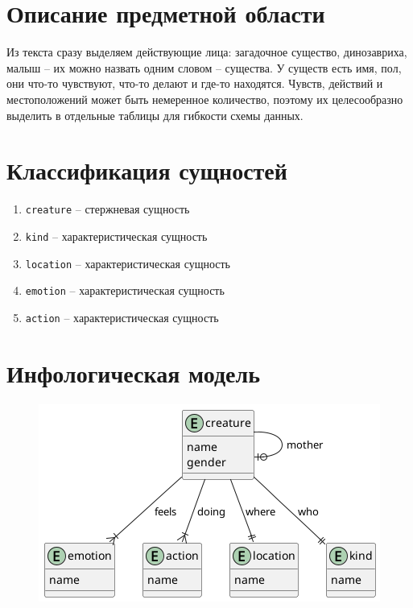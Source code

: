 \documentclass{article}
\begin{document}
\section{Описание предметной области}

Из текста сразу выделяем действующие лица:
загадочное существо, динозавриха,
малыш -- их можно назвать одним словом --
существа. У существ есть имя, пол, они что-то
чувствуют, что-то делают и где-то находятся.
Чувств, действий и местоположений может быть
немеренное количество, поэтому их целесообразно
выделить в отдельные таблицы для гибкости схемы
данных.

\section{Классификация сущностей}

\begin{enumerate}
    \item \texttt{creature} -- стержневая сущность
    \item \texttt{kind} -- характеристическая сущность
    \item \texttt{location} -- характеристическая сущность
    \item \texttt{emotion} -- характеристическая сущность
    \item \texttt{action} -- характеристическая сущность
\end{enumerate}

\section{Инфологическая модель}

\begin{figure}[th]
    \includegraphics[scale=0.5]{./high-er-diagram.png}
    \centering
\end{figure}

\newpage
\end{document}
